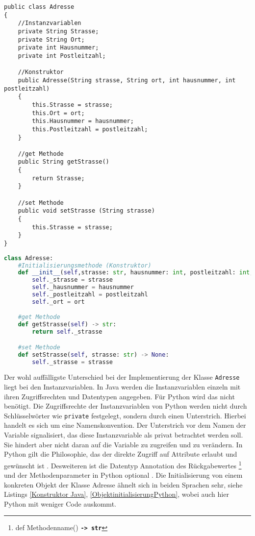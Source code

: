 \begin{lstlisting}[caption=Die Klasse Adresse in Java, label=Adressejava]
public class Adresse
{
    //Instanzvariablen
    private String Strasse;
    private String Ort;
    private int Hausnummer;
    private int Postleitzahl;

    //Konstruktor
    public Adresse(String strasse, String ort, int hausnummer, int postleitzahl)
    {
        this.Strasse = strasse;
        this.Ort = ort;
        this.Hausnummer = hausnummer;
        this.Postleitzahl = postleitzahl;
    }

    //get Methode
    public String getStrasse() 
    {
        return Strasse;
    }

    //set Methode
    public void setStrasse (String strasse)
    {
        this.Strasse = strasse;
    }
}
\end{lstlisting}

\begin{lstlisting}[caption=Die Klasse Adresse in Python, label=lst:AdressePython,language=Python]
class Adresse:
    #Initialisierungsmethode (Konstruktor)
    def __init__(self,strasse: str, hausnummer: int, postleitzahl: int, ort: str) -> None:
        self._strasse = strasse
        self._hausnummer = hausnummer
        self._postleitzahl = postleitzahl
        self._ort = ort   

    #get Methode
    def getStrasse(self) -> str:
        return self._strasse

    #set Methode
    def setStrasse(self, strasse: str) -> None:
        self._strasse = strasse

\end{lstlisting}

Der wohl auffälligste Unterschied bei der Implementierung der Klasse \texttt{Adresse} liegt bei den Instanzvariablen. In Java werden die Instanzvariablen einzeln mit ihren Zugriffsrechten und Datentypen angegeben. Für Python wird das nicht benötigt. Die Zugriffsrechte der Instanzvariablen von Python werden nicht durch Schlüsselwörter wie \texttt{private} festgelegt, sondern durch einen Unterstrich. Hierbei handelt es sich um eine Namenskonvention. Der Unterstrich vor dem Namen der Variable signalisiert, das diese Instanzvariable als privat betrachtet werden soll. Sie hindert aber nicht daran auf die Variable zu zugreifen und zu verändern. In Python gilt die Philosophie, das der direkte Zugriff auf Attribute erlaubt und gewünscht ist \cite{PythonKalista}. Desweiteren ist die Datentyp Annotation des Rückgabewertes \footnote{def Methodenname() \textbf{\texttt{-> str}}} und der Methodenparameter in Python optional \cite{PythonBarry}. Die Initialisierung von einem konkreten Objekt der Klasse Adresse ähnelt sich in beiden Sprachen sehr, siehe Listings \ref{Konstruktor Java}, \ref{ObjektinitialisierungPython}, wobei auch hier Python mit weniger Code auskommt. 

